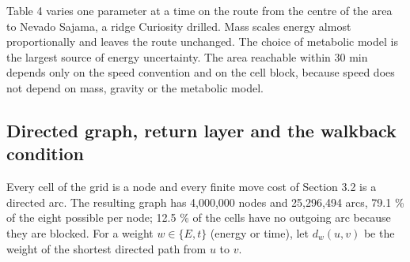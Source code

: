 \documentclass[11pt,a4paper]{article}
\begin{document}
Table 4 varies one parameter at a time on the route from the centre of the area to Nevado Sajama, a ridge Curiosity drilled. Mass scales energy almost proportionally and leaves the route unchanged. The choice of metabolic model is the largest source of energy uncertainty. The area reachable within 30 min depends only on the speed convention and on the cell block, because speed does not depend on mass, gravity or the metabolic model.

\begin{table}[H]
\centering\small
\caption{Sensitivity of the cost model.}
\end{table}

\subsection{Directed graph, return layer and the walkback condition}

Every cell of the grid is a node and every finite move cost of Section 3.2 is a directed arc. The resulting graph has 4,000,000 nodes and 25,296,494 arcs, 79.1 \% of the eight possible per node; 12.5 \% of the cells have no outgoing arc because they are blocked. For a weight $w \in \{E, t\}$ (energy or time), let $d_w(u, v)$ be the weight of the shortest directed path from $u$ to $v$.
\end{document}
